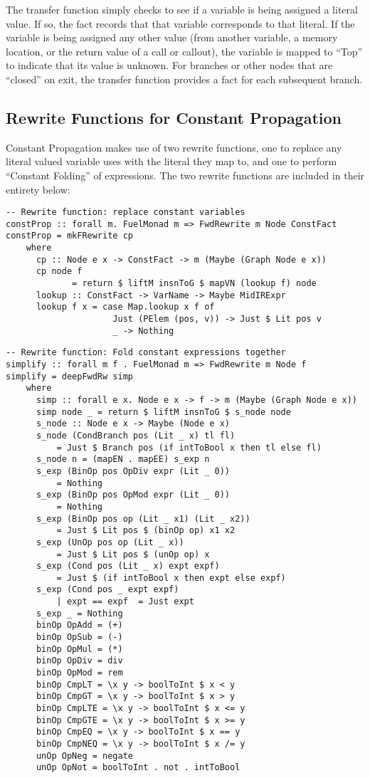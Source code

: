 \documentclass[11pt]{article}
\begin{document}
The transfer function simply checks to see if a variable is being assigned a literal value. If so, the fact records that that variable corresponds to that literal. If the variable is being assigned any other value (from another variable, a memory location, or the return value of a call or callout), the variable is mapped to ``Top'' to indicate that its value is unknown. For branches or other nodes that are ``closed'' on exit, the transfer function provides a fact for each subsequent branch. 

\subsection { Rewrite Functions for Constant Propagation }

Constant Propagation makes use of two rewrite functions, one to replace any literal valued variable uses with the literal they map to, and one to perform ``Constant Folding'' of expressions. The two rewrite functions are included in their entirety below: 

\begin{verbatim}
-- Rewrite function: replace constant variables
constProp :: forall m. FuelMonad m => FwdRewrite m Node ConstFact
constProp = mkFRewrite cp 
    where 
      cp :: Node e x -> ConstFact -> m (Maybe (Graph Node e x))
      cp node f 
             = return $ liftM insnToG $ mapVN (lookup f) node
      lookup :: ConstFact -> VarName -> Maybe MidIRExpr
      lookup f x = case Map.lookup x f of 
                     Just (PElem (pos, v)) -> Just $ Lit pos v
                     _ -> Nothing
\end{verbatim}

\begin{verbatim}
-- Rewrite function: Fold constant expressions together
simplify :: forall m f . FuelMonad m => FwdRewrite m Node f
simplify = deepFwdRw simp 
    where 
      simp :: forall e x. Node e x -> f -> m (Maybe (Graph Node e x))
      simp node _ = return $ liftM insnToG $ s_node node 
      s_node :: Node e x -> Maybe (Node e x)
      s_node (CondBranch pos (Lit _ x) tl fl) 
          = Just $ Branch pos (if intToBool x then tl else fl)
      s_node n = (mapEN . mapEE) s_exp n 
      s_exp (BinOp pos OpDiv expr (Lit _ 0)) 
          = Nothing
      s_exp (BinOp pos OpMod expr (Lit _ 0)) 
          = Nothing
      s_exp (BinOp pos op (Lit _ x1) (Lit _ x2)) 
          = Just $ Lit pos $ (binOp op) x1 x2
      s_exp (UnOp pos op (Lit _ x))
          = Just $ Lit pos $ (unOp op) x
      s_exp (Cond pos (Lit _ x) expt expf)
          = Just $ (if intToBool x then expt else expf)
      s_exp (Cond pos _ expt expf)
          | expt == expf  = Just expt
      s_exp _ = Nothing
      binOp OpAdd = (+)
      binOp OpSub = (-)
      binOp OpMul = (*)
      binOp OpDiv = div
      binOp OpMod = rem
      binOp CmpLT = \x y -> boolToInt $ x < y
      binOp CmpGT = \x y -> boolToInt $ x > y 
      binOp CmpLTE = \x y -> boolToInt $ x <= y 
      binOp CmpGTE = \x y -> boolToInt $ x >= y 
      binOp CmpEQ = \x y -> boolToInt $ x == y 
      binOp CmpNEQ = \x y -> boolToInt $ x /= y
      unOp OpNeg = negate 
      unOp OpNot = boolToInt . not . intToBool
\end{verbatim}
\end{document}
